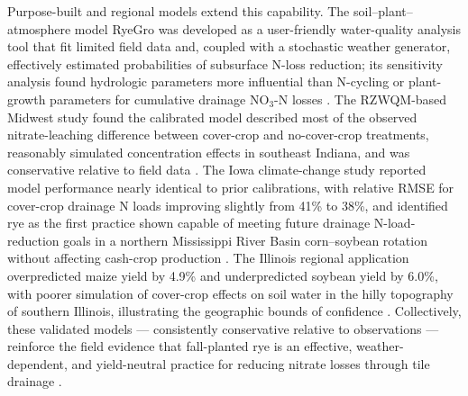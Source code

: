 Purpose-built and regional models extend this capability. The soil--plant--atmosphere model RyeGro was developed as a user-friendly water-quality analysis tool that fit limited field data and, coupled with a stochastic weather generator, effectively estimated probabilities of subsurface N-loss reduction; its sensitivity analysis found hydrologic parameters more influential than N-cycling or plant-growth parameters for cumulative drainage NO$_3$-N losses \parencite{Feyereisen2006b}. The RZWQM-based Midwest study found the calibrated model described most of the observed nitrate-leaching difference between cover-crop and no-cover-crop treatments, reasonably simulated concentration effects in southeast Indiana, and was conservative relative to field data \parencite{Malone2014b}. The Iowa climate-change study reported model performance nearly identical to prior calibrations, with relative RMSE for cover-crop drainage N loads improving slightly from 41\% to 38\%, and identified rye as the first practice shown capable of meeting future drainage N-load-reduction goals in a northern Mississippi River Basin corn--soybean rotation without affecting cash-crop production \parencite{Malone2020}. The Illinois regional application overpredicted maize yield by 4.9\% and underpredicted soybean yield by 6.0\%, with poorer simulation of cover-crop effects on soil water in the hilly topography of southern Illinois, illustrating the geographic bounds of confidence \parencite{Gupta2023b}. Collectively, these validated models --- consistently conservative relative to observations \parencite{Malone2014b,Malone2018} --- reinforce the field evidence that fall-planted rye is an effective, weather-dependent, and yield-neutral practice for reducing nitrate losses through tile drainage \parencite{Chatterjee2025,MartinezFeria2016,Yang2021}.